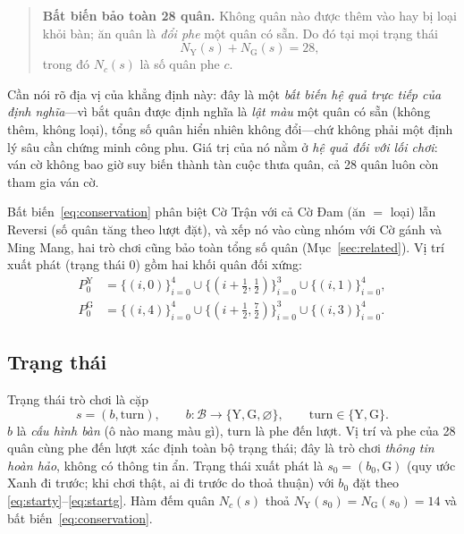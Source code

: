 \begin{quote}
\textbf{Bất biến bảo toàn 28 quân.} Không quân nào được thêm vào hay
bị loại khỏi bàn; ăn quân là \emph{đổi phe} một quân có sẵn. Do đó tại
mọi trạng thái
\begin{equation}
N_{\mathrm Y}(s)+N_{\mathrm G}(s)=28,
\label{eq:conservation}
\end{equation}
trong đó $N_c(s)$ là số quân phe $c$.
\end{quote}

Cần nói rõ địa vị của khẳng định này: đây là một \emph{bất biến hệ quả
trực tiếp của định nghĩa}---vì bắt quân được định nghĩa là \emph{lật màu}
một quân có sẵn (không thêm, không loại), tổng số quân hiển nhiên không
đổi---chứ không phải một định lý sâu cần chứng minh công phu. Giá trị của
nó nằm ở \emph{hệ quả đối với lối chơi}: ván cờ không bao giờ suy biến
thành tàn cuộc thưa quân, cả 28 quân luôn còn tham gia ván cờ.

Bất biến~\eqref{eq:conservation} phân biệt Cờ Trận với cả Cờ
Đam (ăn $=$ loại) lẫn Reversi (số quân tăng theo lượt đặt), và xếp nó vào
cùng nhóm với Cờ gánh và Ming Mang, hai trò chơi cũng bảo toàn tổng số quân
(Mục~\ref{sec:related}). Vị trí xuất
phát (trạng thái $0$) gồm hai khối quân đối xứng:
\begin{align}
P^{\mathrm Y}_0 &= \{(i,0)\}_{i=0}^{4}\cup\{(i{+}\tfrac12,\tfrac12)\}_{i=0}^{3}\cup\{(i,1)\}_{i=0}^{4},
\label{eq:starty}\\
P^{\mathrm G}_0 &= \{(i,4)\}_{i=0}^{4}\cup\{(i{+}\tfrac12,\tfrac72)\}_{i=0}^{3}\cup\{(i,3)\}_{i=0}^{4}.
\label{eq:startg}
\end{align}

\subsection{Trạng thái}
\label{ssec:state}

Trạng thái trò chơi là cặp
\begin{equation}
\boxed{\;s=(b,\mathrm{turn}),\qquad
b:\mathcal B\to\{\mathrm Y,\mathrm G,\varnothing\},\qquad
\mathrm{turn}\in\{\mathrm Y,\mathrm G\}.\;}
\label{eq:state}
\end{equation}
$b$ là \emph{cấu hình bàn} (ô nào mang màu gì), $\mathrm{turn}$ là phe
đến lượt. Vị trí và phe của 28 quân cùng phe đến lượt xác định toàn
bộ trạng thái; đây là trò chơi \emph{thông tin hoàn hảo}, không có thông
tin ẩn. Trạng thái xuất phát là $s_0=(b_0,\mathrm G)$ (quy ước Xanh đi
trước; khi chơi thật, ai đi trước do thoả thuận) với $b_0$ đặt theo
\eqref{eq:starty}--\eqref{eq:startg}. Hàm đếm quân $N_c(s)$ thoả
$N_{\mathrm Y}(s_0)=N_{\mathrm G}(s_0)=14$ và bất biến~\eqref{eq:conservation}.

